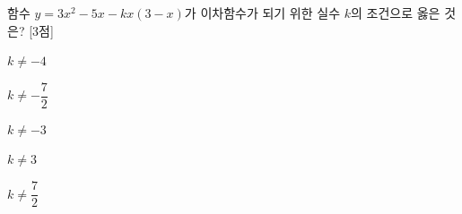 함수 $y=3x^2-5x-kx(3-x)$가 이차함수가 되기 위한 실수 $k$의 조건으로 옳은 것은? \mbox{[3점]}
\begin{choices32}{\rule[-3ex]{0pt}{8ex}$k\ne-4$}{\rule[-3ex]{0pt}{8ex}$k\ne-\dfrac{7}{2}$}{\rule[-3ex]{0pt}{8ex}$k\ne-3$}{\rule[-3ex]{0pt}{8ex}$k\ne3$}{\rule[-3ex]{0pt}{8ex}$k\ne\dfrac{7}{2}$}\end{choices32}
